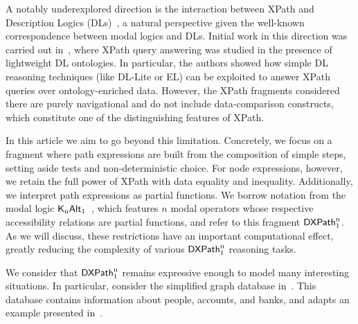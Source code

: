 
A notably underexplored direction is the interaction between XPath and Description Logics (DLs)~\cite{DLhandbook2003,DLbook17}, a natural perspective given the well-known correspondence between modal logics and DLs. Initial work in this direction was carried out in~\cite{KostylevRV14,Kost:xpat15}, where XPath query answering was studied in the presence of lightweight DL ontologies. In particular, the authors showed how simple DL reasoning techniques (like DL-Lite or EL) can be exploited to answer XPath queries over ontology-enriched data. However, the XPath fragments considered there are purely navigational and do not include data-comparison constructs, which constitute one of the distinguishing features of XPath.

In this article we aim to go beyond this limitation. Concretely, we focus on a fragment where path expressions are built from the composition of simple steps, setting aside tests and non-deterministic choice. For node expressions, however, we retain the full power of XPath with data equality and inequality. Additionally, we interpret path expressions as partial functions. We borrow notation from the modal logic $\mathsf{K}_{\rm n}\mathsf{Alt}_{\rm 1}$~\cite{blackburn2001modal}, which features $n$ modal operators whose respective accessibility relations are partial functions, and refer to this fragment $\mathsf{DXPath}_{\rm 1}^{\rm n}$. As we will discuss, these restrictions have an important computational effect, greatly reducing the complexity of various $\mathsf{DXPath}_{\rm 1}^{\rm n}$ reasoning tasks.

We consider that $\mathsf{DXPath}_{\rm 1}^{\rm n}$ remains expressive enough to model many interesting situations. In particular, consider the simplified graph database in~. This database contains information about people, accounts, and banks, and adapts an example presented in~\cite{AbriolaBFF18}.

